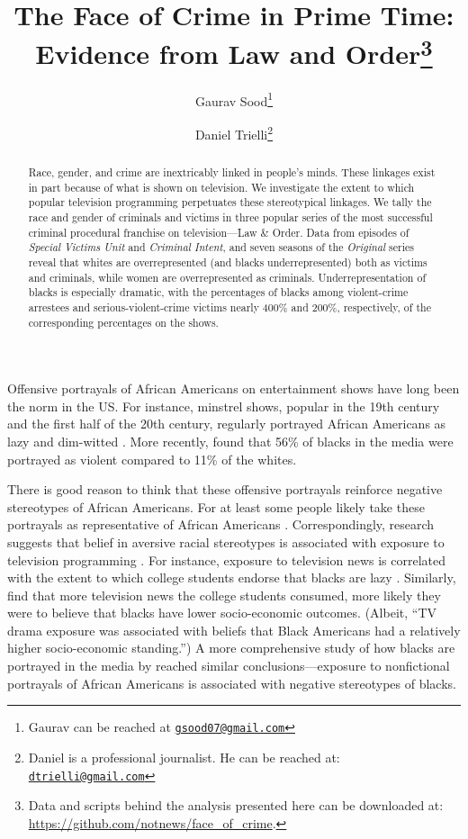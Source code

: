 \documentclass[11pt, letterpaper]{article}
\title{\Large{The Face of Crime in Prime Time:\\ Evidence from Law and Order}\footnote{Data and scripts behind the analysis presented here can be downloaded at: \url{https://github.com/notnews/face_of_crime}.}}
\author{Gaurav Sood\thanks{Gaurav can be reached at \href{mailto:gsood07@gmail.com}{\footnotesize{\texttt{gsood07@gmail.com}}}} \and Daniel Trielli\thanks{Daniel is a professional journalist. He can be reached at: \href{mailto:dtrielli@gmail.com}{\footnotesize{\texttt{dtrielli@gmail.com}}}}\vspace{.5cm}}
\date{}
\begin{document}
\maketitle

\begin{abstract}
\noindent Race, gender, and crime are inextricably linked in people's minds. These linkages exist in part because of what is shown on television. We investigate the extent to which popular television programming perpetuates these stereotypical linkages. We tally the race and gender of criminals and victims in three popular series of the most successful criminal procedural franchise on television---Law \& Order. Data from episodes of \textit{Special Victims Unit} and \textit{Criminal Intent}, and seven seasons of the \textit{Original} series reveal that whites are overrepresented (and blacks underrepresented) both as victims and criminals, while women are overrepresented as criminals. Underrepresentation of blacks is especially dramatic, with the percentages of blacks among violent-crime arrestees and serious-violent-crime victims nearly 400\% and 200\%, respectively, of the corresponding percentages on the shows.
\end{abstract}

Offensive portrayals of African Americans on entertainment shows have long been the norm in the US. For instance, minstrel shows, popular in the 19th century and the first half of the 20th century, regularly portrayed African Americans as lazy and dim-witted \citep{dates1993split, toll1974blacking}. More recently, \citet{entman2001black} found that 56\% of blacks in the media were portrayed as violent compared to 11\% of the whites.

There is good reason to think that these offensive portrayals reinforce negative stereotypes of African Americans. For at least some people likely take these portrayals as representative of African Americans \citep[see][]{punyanunt2008perceived}. Correspondingly, research suggests that belief in aversive racial stereotypes is associated with exposure to television programming \citep{busselle2002television, entman2001black, armstrong1992tv}. For instance, exposure to television news is correlated with the extent to which college students endorse that blacks are lazy \citep{busselle2002television}. Similarly, \citet{armstrong1992tv} find that more television news the college students consumed, more likely they were to believe that blacks have lower socio-economic outcomes. (Albeit, ``TV drama exposure was associated with beliefs that Black Americans had a relatively higher socio-economic standing.'') A more comprehensive study of how blacks are portrayed in the media by \citet{entman2001black} reached similar conclusions---exposure to nonfictional portrayals of African Americans is associated with negative stereotypes of blacks.
\end{document}
